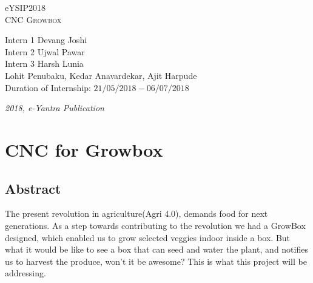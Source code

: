 \documentclass[a4paper,12pt,oneside]{book}
\begin{document}
\begin{titlepage}
\raggedright
{\Large eYSIP2018\\[1cm]}
{\Huge\scshape CNC Growbox \\[.1in]}
\vfill
\begin{flushright}
{\large Intern 1 Devang Joshi \\}
{\large Intern 2 Ujwal Pawar \\}
{\large Intern 3 Harsh Lunia \\}
{\large Lohit Penubaku, Kedar Anavardekar, Ajit Harpude \\}
{\large Duration of Internship: $ 21/05/2018-06/07/2018 $ \\}
\end{flushright}

{\itshape 2018, e-Yantra Publication}
\end{titlepage}

\chapter[Project Tag]{CNC for Growbox}
\section*{Abstract}
The present revolution in agriculture(Agri 4.0), demands food for next generations. As a step towards contributing to the revolution we had a GrowBox designed, which enabled us to grow selected veggies indoor inside a box. But what it would be like to see a box that can seed and water the plant, and notifies us to harvest the produce, won't it be awesome? This is what this project will be addressing. 
\end{document}

